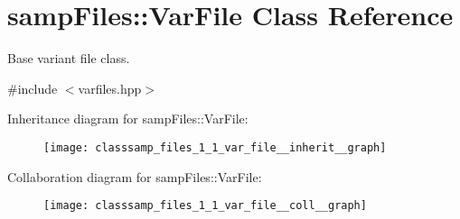 \hypertarget{classsamp_files_1_1_var_file}{}\section{samp\+Files\+:\+:Var\+File Class Reference}
\label{classsamp_files_1_1_var_file}


Base variant file class.  




{\ttfamily \#include $<$varfiles.\+hpp$>$}



Inheritance diagram for samp\+Files\+:\+:Var\+File\+:\nopagebreak
\begin{figure}[H]
\begin{center}
\leavevmode
\texttt{[image: classsamp\_files\_1\_1\_var\_file\_\_inherit\_\_graph]}
\end{center}
\end{figure}


Collaboration diagram for samp\+Files\+:\+:Var\+File\+:\nopagebreak
\begin{figure}[H]
\begin{center}
\leavevmode
\texttt{[image: classsamp\_files\_1\_1\_var\_file\_\_coll\_\_graph]}
\end{center}
\end{figure}
